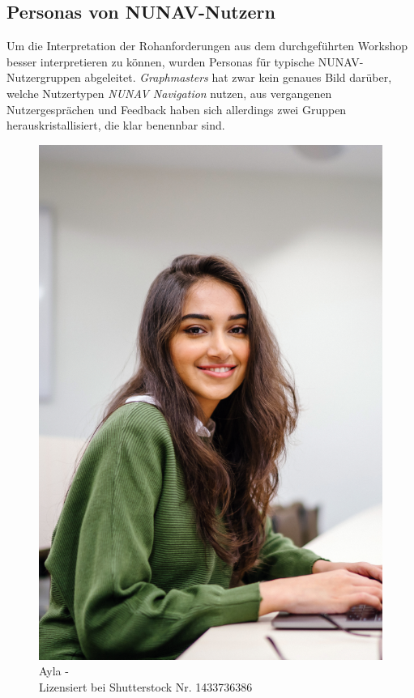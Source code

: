 \subsection{Personas von NUNAV-Nutzern}
\label{sec:06_model_evaluation:personas}

Um die Interpretation der Rohanforderungen aus dem durchgeführten Workshop besser interpretieren zu können, wurden Personas für typische NUNAV-Nutzergruppen abgeleitet. \textit{Graphmasters} hat zwar kein genaues Bild darüber, welche Nutzertypen \textit{NUNAV Navigation} nutzen, aus vergangenen Nutzergesprächen und Feedback haben sich allerdings zwei Gruppen herauskristallisiert, die klar benennbar sind.

\begin{figure}
    \vspace{-\intextsep}
    \centering
    \includegraphics[width=\textwidth]{contents/06_model_evaluation/01_integration/res/persona_picture_ayla.png}
    \caption[]{Ayla -\\Lizensiert bei Shutterstock Nr. 1433736386}
\end{figure}

